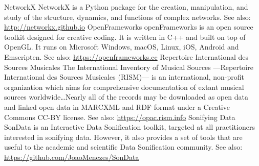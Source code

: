 	{NetworkX}
	{NetworkX is a Python package for the creation, manipulation, and study of the structure, dynamics, and functions of complex networks. See also: \url{http://networkx.github.io}}
	{OpenFrameworks}
	{openFrameworks is an open source toolkit designed for creative coding. It is written in C++ and built on top of OpenGL. It runs on Microsoft Windows, macOS, Linux, iOS, Android and Emscripten. See also: \url{https://openframeworks.cc}}
	{Repertoire International des Sources Musicales}
	{The International Inventory of Musical Sources ---Repertoire International des Sources Musicales (RISM)--- is an international, non-profit organization which aims for comprehensive documentation of extant musical sources worldwide\dots Nearly all of the records may be downloaded as open data and linked open data in MARCXML and RDF format under a Creative Commons CC-BY license. See also: \url{https://opac.rism.info}}
	{Sonifying Data}
	{SonData is an Interactive Data Sonification toolkit, targeted at all practitioners interested in sonifying data. However, it also provides a set of tools that are useful to the academic and scientific Data Sonification community. See also: \url{https://github.com/JoaoMenezes/SonData}}
